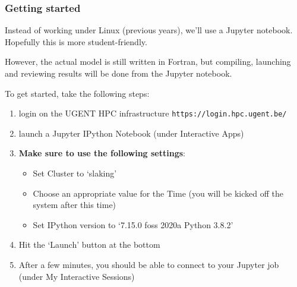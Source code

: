 \documentclass[aspectratio=43,9pt]{beamer}
\begin{document}
\begin{frame}
	
	\frametitle{Getting started}
	
	\begin{myitemize}{3ex}
		\item Instead of working under Linux (previous years), we'll use a Jupyter notebook. Hopefully this is more student-friendly.
		\item However, the actual model is still written in Fortran, but compiling, launching and reviewing results will be done from the Jupyter notebook.
		\item To get started, take the following steps:\vspace*{2ex}
			\begin{enumerate}
				\item login on the UGENT HPC infrastructure \texttt{https://login.hpc.ugent.be/}\vspace*{2ex}
				\item launch a Jupyter IPython Notebook (under Interactive Apps)\vspace*{2ex}
				\item \textbf{Make sure to use the following settings}:
					\begin{itemize}
						\item Set Cluster to `slaking'
						\item Choose an appropriate value for the Time (you will be kicked off the system after this time)
						\item Set IPython version to `7.15.0 foss 2020a Python 3.8.2'\vspace*{2ex}
					\end{itemize}
				\item Hit the `Launch' button at the bottom\vspace*{2ex}
				\item After a few minutes, you should be able to connect to your Jupyter job (under My Interactive Sessions)
			\end{enumerate}
	\end{myitemize}
	
\end{frame}
%
%
\end{document}
